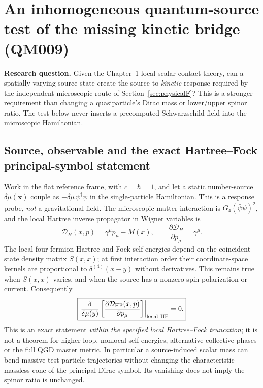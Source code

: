 \documentclass[11pt,a4paper]{article}
\begin{document}
\section{An inhomogeneous quantum-source test of the missing kinetic bridge (QM009)}\label{sec:qm009}
\textbf{Research question.} Given the Chapter~1 local scalar-contact theory, can a spatially varying source state create the source-to-\emph{kinetic} response required by the independent-microscopic route of Section~\ref{sec:physicalF}? This is a stronger requirement than changing a quasiparticle's Dirac mass or lower/upper spinor ratio. The test below never inserts a precomputed Schwarzschild field into the microscopic Hamiltonian.

\subsection{Source, observable and the exact Hartree--Fock principal-symbol statement}
Work in the flat reference frame, with $c=\hbar=1$, and let a static number-source $\delta\mu(\bm x)$ couple as $-\delta\mu\,\psi^\dagger\psi$ in the single-particle Hamiltonian. This is a response probe, \emph{not} a gravitational field. The microscopic matter interaction is $G_4(\bar\psi\psi)^2$, and the local Hartree inverse propagator in Wigner variables is
\begin{equation}\label{eq:qm009-dirac}
\mathcal D_H(x,p)=\gamma^\mu p_\mu-M(x),\qquad
 \frac{\partial\mathcal D_H}{\partial p_\mu}=\gamma^\mu.
\end{equation}
The local four-fermion Hartree and Fock self-energies depend on the coincident state density matrix $S(x,x)$; at first interaction order their coordinate-space kernels are proportional to $\delta^{(4)}(x-y)$ without derivatives. This remains true when $S(x,x)$ varies, and when the source has a nonzero spin polarization or current. Consequently
\begin{equation}\label{eq:qm009-zero}
\boxed{\left.\frac{\delta}{\delta\mu(y)}\left[\frac{\partial\mathcal D_{\rm HF}(x,p)}{\partial p_\mu}\right]\right|_{\rm local\ HF}=0.}
\end{equation}
This is an exact statement \emph{within the specified local Hartree--Fock truncation}; it is not a theorem for higher-loop, nonlocal self-energies, alternative collective phases or the full QGD master metric. In particular a source-induced scalar mass can bend massive test-particle trajectories without changing the characteristic massless cone of the principal Dirac symbol. Its vanishing does not imply the spinor ratio is unchanged.
\end{document}
